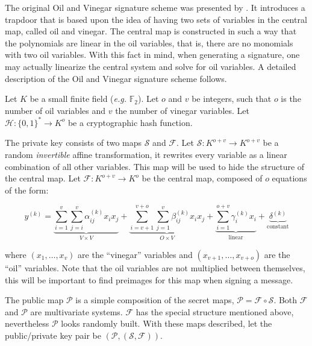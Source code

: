 \documentclass{ufsctex/ufsctex}
\begin{document}
The original Oil and Vinegar signature scheme was presented by
\cite{patarin1997ov}. It introduces a trapdoor that is based upon the idea of
having two sets of variables in the central map, called oil and vinegar. The
central map is constructed in such a way that the polynomials are linear in the
oil variables, that is, there are no monomials with two oil variables. With
this fact in mind, when generating a signature, one may actually linearize the
central system and solve for oil variables. A detailed description of the Oil
and Vinegar signature scheme follows.

Let $K$ be a small finite field (\textit{e.g.} $\mathbb{F}_2$). Let $o$ and $v$
be integers, such that $o$ is the number of oil variables and $v$ the number of
vinegar variables. Let $\mathcal{H}: \{0,1\}^* \to K^o$ be a cryptographic hash
function.

The private key consists of two maps $\mathcal{S}$ and $\mathcal{F}$. Let
$\mathcal{S}: K^{o+v} \to K^{o+v}$ be a random \textit{invertible} affine
transformation, it rewrites every variable as a linear combination of all other
variables. This map will be used to hide the structure of the central map. Let
$\mathcal{F}: K^{o+v} \to K^{o}$ be the central map, composed of $o$ equations
of the form:

\begin{equation}\label{eq:ovpolynomial}
y^{(k)} =
\underbrace{\sum_{i=1}^{v}\sum_{j=i}^{v} \alpha^{(k)}_{ij} x_i x_j}_{
V \times V} +
\underbrace{\sum_{i=v+1}^{v+o}\sum_{j=1}^{v} \beta^{(k)}_{ij} x_i x_j}_{
O \times V} +
\underbrace{\sum_{i=1}^{o+v} \gamma^{(k)}_{i} x_i}_{\text{linear}} +
\underbrace{\delta^{(k)}}_{\text{constant}}
\end{equation}

where $(x_1,\dots,x_v)$ are the ``vinegar'' variables and
$(x_{v+1},\dots,x_{v+o})$ are the ``oil'' variables. Note that the oil
variables are not multiplied between themselves, this will be important to find
preimages for this map when signing a message.

The public map $\mathcal{P}$ is a simple composition of the secret maps,
$\mathcal{P} = \mathcal{F} \circ \mathcal{S}$. Both $\mathcal{F}$ and
$\mathcal{P}$ are multivariate systems. $\mathcal{F}$ has the special structure
mentioned above, nevertheless $\mathcal{P}$ looks randomly built. With these
maps described, let the public/private key pair be
$(\mathcal{P},(\mathcal{S},\mathcal{F}))$.
\end{document}
